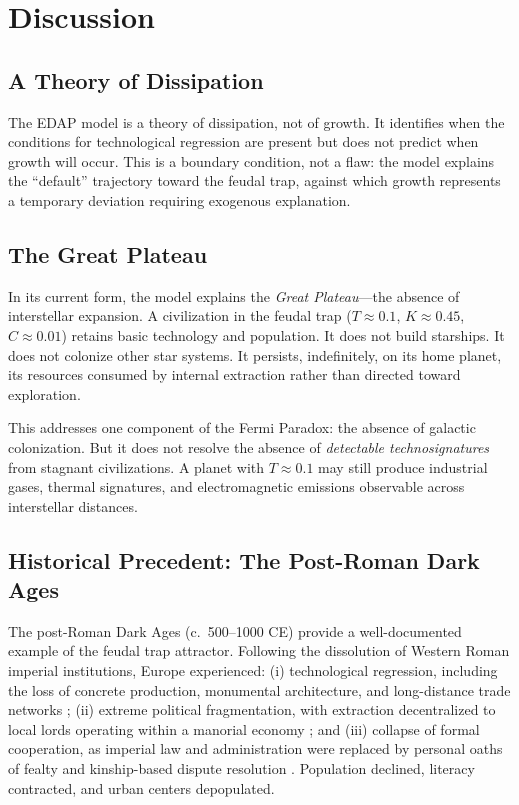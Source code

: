 \section{Discussion}

\subsection{A Theory of Dissipation}

The EDAP model is a theory of dissipation, not of growth. It identifies when the conditions for technological regression are present but does not predict when growth will occur. This is a boundary condition, not a flaw: the model explains the ``default'' trajectory toward the feudal trap, against which growth represents a temporary deviation requiring exogenous explanation.

\subsection{The Great Plateau}

In its current form, the model explains the \emph{Great Plateau}---the absence of interstellar expansion. A civilization in the feudal trap ($T \approx 0.1$, $K \approx 0.45$, $C \approx 0.01$) retains basic technology and population. It does not build starships. It does not colonize other star systems. It persists, indefinitely, on its home planet, its resources consumed by internal extraction rather than directed toward exploration.

This addresses one component of the Fermi Paradox: the absence of galactic colonization. But it does not resolve the absence of \emph{detectable technosignatures} from stagnant civilizations. A planet with $T \approx 0.1$ may still produce industrial gases, thermal signatures, and electromagnetic emissions observable across interstellar distances.

\subsection{Historical Precedent: The Post-Roman Dark Ages}

The post-Roman Dark Ages (c.\ 500--1000 CE) provide a well-documented example of the feudal trap attractor. Following the dissolution of Western Roman imperial institutions, Europe experienced: (i) technological regression, including the loss of concrete production, monumental architecture, and long-distance trade networks \cite{wardperkins2005}; (ii) extreme political fragmentation, with extraction decentralized to local lords operating within a manorial economy \cite{wickham2009}; and (iii) collapse of formal cooperation, as imperial law and administration were replaced by personal oaths of fealty and kinship-based dispute resolution \cite{mccormick2001}. Population declined, literacy contracted, and urban centers depopulated.

